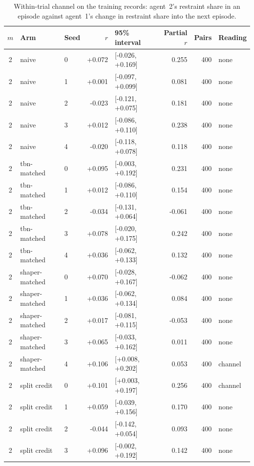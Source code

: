 \begin{table}[ht]
\centering\small
\caption{Within-trial channel on the training records: agent~2's restraint share in an episode against agent~1's change in restraint share into the next episode.}
\label{tab:channel}
\begin{tabular}{cllrlrrl}
\toprule
$m$ & Arm & Seed & $r$ & 95\% interval & Partial $r$ & Pairs & Reading \\
\midrule
2 & naive & 0 & +0.072 & [-0.026, +0.169] & 0.255 & 400 & none \\
2 & naive & 1 & +0.001 & [-0.097, +0.099] & 0.081 & 400 & none \\
2 & naive & 2 & -0.023 & [-0.121, +0.075] & 0.181 & 400 & none \\
2 & naive & 3 & +0.012 & [-0.086, +0.110] & 0.238 & 400 & none \\
2 & naive & 4 & -0.020 & [-0.118, +0.078] & 0.118 & 400 & none \\
2 & tbn-matched & 0 & +0.095 & [-0.003, +0.192] & 0.231 & 400 & none \\
2 & tbn-matched & 1 & +0.012 & [-0.086, +0.110] & 0.154 & 400 & none \\
2 & tbn-matched & 2 & -0.034 & [-0.131, +0.064] & -0.061 & 400 & none \\
2 & tbn-matched & 3 & +0.078 & [-0.020, +0.175] & 0.242 & 400 & none \\
2 & tbn-matched & 4 & +0.036 & [-0.062, +0.133] & 0.132 & 400 & none \\
2 & shaper-matched & 0 & +0.070 & [-0.028, +0.167] & -0.062 & 400 & none \\
2 & shaper-matched & 1 & +0.036 & [-0.062, +0.134] & 0.084 & 400 & none \\
2 & shaper-matched & 2 & +0.017 & [-0.081, +0.115] & -0.053 & 400 & none \\
2 & shaper-matched & 3 & +0.065 & [-0.033, +0.162] & 0.011 & 400 & none \\
2 & shaper-matched & 4 & +0.106 & [+0.008, +0.202] & 0.053 & 400 & channel \\
2 & split credit & 0 & +0.101 & [+0.003, +0.197] & 0.256 & 400 & channel \\
2 & split credit & 1 & +0.059 & [-0.039, +0.156] & 0.170 & 400 & none \\
2 & split credit & 2 & -0.044 & [-0.142, +0.054] & 0.093 & 400 & none \\
2 & split credit & 3 & +0.096 & [-0.002, +0.192] & 0.142 & 400 & none \\

\end{tabular}
\end{table}
